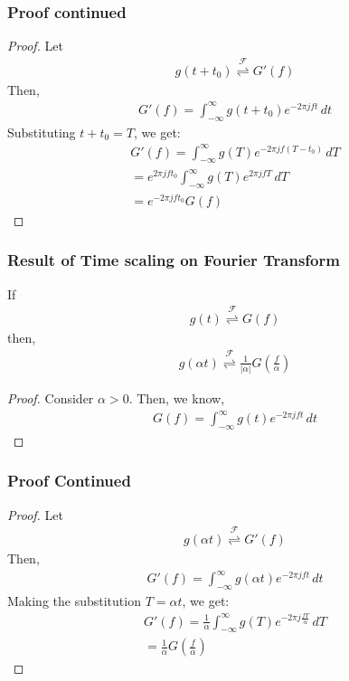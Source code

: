 \documentclass{beamer}
\providecommand{\brak}[1]{\ensuremath{\left(#1\right)}}
\providecommand{\fourier}{\overset{\mathcal{F}}{ \rightleftharpoons}}
\providecommand{\abs}[1]{\left\vert#1\right\vert}
\begin{document}
\begin{frame}[fragile]
\frametitle{Proof continued}
\begin{flushleft}

\begin{proof}
Let 
\begin{align}
    g(t + t_0) \fourier G'(f)
\end{align}
Then,
\begin{align}
    G'(f) = \int_{-\infty}^\infty g(t + t_0) e^{-2\pi j ft} \,dt
\end{align}
Substituting $t + t_0 = T$, we get:
\begin{align}
    G'(f) = \int_{-\infty}^\infty g(T) e^{-2\pi j f(T - t_0)} \,dT\\
      =e^{2\pi j ft_0} \int_{-\infty}^\infty g(T) e^{2\pi j fT} \,dT\\
       = e^{-2\pi j ft_0}G(f)
\end{align}
\end{proof}
\end{flushleft}
\end{frame}


\begin{frame}[fragile]
\frametitle{Result of Time scaling on Fourier Transform}
\begin{flushleft}
\begin{lemma}
If 
\begin{align}
    g(t) \fourier G(f)
\end{align}
then,
\begin{align}
    g(\alpha t) \fourier \frac{1}{\abs{\alpha}}G\brak{\frac{f}{\alpha}}
\end{align}
\label{scale}
\end{lemma}
\begin{proof}
Consider $\alpha > 0$. Then, we know, 
\begin{align}
    G(f) = \int_{-\infty}^\infty g(t) e^{-2\pi j ft} \,dt
\end{align}
\end{proof}
\end{flushleft}

\end{frame}


\begin{frame}[fragile]
\frametitle{Proof Continued}
\begin{flushleft}
\begin{proof}
Let 
\begin{align}
    g(\alpha t) \fourier G'(f)
\end{align}
Then,
\begin{align}
    G'(f) = \int_{-\infty}^\infty g(\alpha t) e^{-2\pi j ft} \,dt
\end{align}
Making the substitution $T = \alpha t$, we get:
\begin{align}
     G'(f) = \frac{1}{\alpha}\int_{-\infty}^\infty g(T) e^{-2\pi j \frac{f T}{\alpha}} \,dT\\
     = \frac{1}{\alpha}G\brak{\frac{f}{\alpha}}
\end{align}
\end{proof}
\end{flushleft}

\end{frame}
\end{document}
